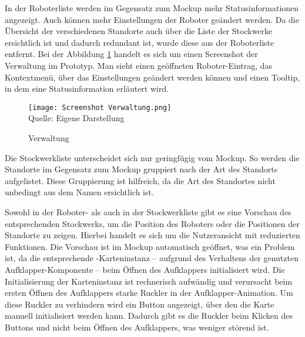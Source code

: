 In der Roboterliste werden im Gegensatz zum \gls{Mockup} mehr Statusinformationen angezeigt. Auch können mehr Einstellungen der Roboter geändert werden. Da die Übersicht der verschiedenen Standorte auch über die Liste der Stockwerke ersichtlich ist und dadurch redundant ist, wurde diese aus der Roboterliste entfernt. Bei der Abbildung \ref{fig:RobotlistScreenshot} handelt es sich um einen Screenshot der Verwaltung im Prototyp. Man sieht einen geöffneten Roboter-Eintrag, das Kontextmenü, über das Einstellungen geändert werden können und einen Tooltip, in dem eine Statusinformation erläutert wird.

\begin{figure}[H]
    \caption{Verwaltung}\label{fig:RobotlistScreenshot}
    \texttt{[image: Screenshot Verwaltung.png]}
    \\
    Quelle: Eigene Darstellung
\end{figure}

Die Stockwerkliste unterscheidet sich nur geringfügig vom \gls{Mockup}. So werden die Standorte im Gegensatz zum \gls{Mockup} gruppiert nach der Art des Standorts aufgelistet. Diese Gruppierung ist hilfreich, da die Art des Standortes nicht unbedingt aus dem Namen ersichtlich ist.

Sowohl in der Roboter- als auch in der Stockwerkliste gibt es eine Vorschau des entsprechenden Stockwerks, um die Position des Roboters oder die Positionen der Standorte zu zeigen. Hierbei handelt es sich um die Nutzeransicht mit reduzierten Funktionen. Die Vorschau ist im \gls{Mockup} automatisch geöffnet, was ein Problem ist, da die entsprechende \deckgl{}-Karteninstanz – aufgrund des Verhaltens der genutzten Aufklapper-Komponente – beim Öffnen des Aufklappers initialisiert wird. Die Initialisierung der \deckgl{} Karteninstanz ist rechnerisch aufwändig und verursacht beim ersten Öffnen des Aufklappers starke Ruckler in der Aufklapper-Animation. Um diese Ruckler zu verhindern wird ein Button angezeigt, über den die Karte manuell initialisiert werden kann. Dadurch gibt es die Ruckler beim Klicken des Buttons und nicht beim Öffnen des Aufklappers, was weniger störend ist.

